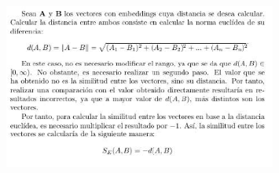 \begin{figure}[htbp]
    \centering
    \includegraphics[width=0.8\textwidth]{Chapters/cap5.PNG}
    \label{fig:mi_imagen2}
\end{figure}
